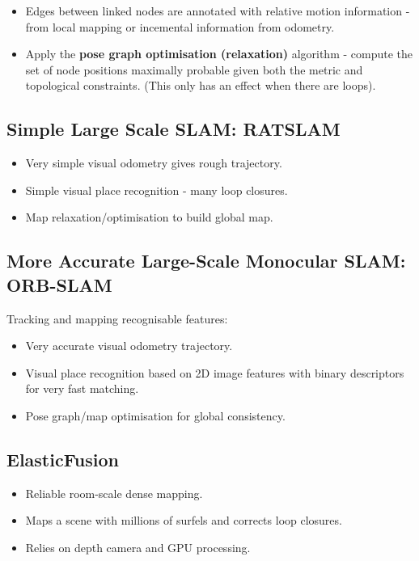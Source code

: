 \documentclass[11pt]{article}
\begin{document}
\begin{itemize}
  \item Edges between linked nodes are annotated with relative motion information - from local mapping or incemental information from odometry.
  \item Apply the \textbf{pose graph optimisation (relaxation)} algorithm - compute the set of node positions maximally probable given both the metric and topological constraints.
    (This only has an effect when there are loops).
\end{itemize}

\subsection{Simple Large Scale SLAM: RATSLAM}
\begin{itemize}
  \item Very simple visual odometry gives rough trajectory.
  \item Simple visual place recognition - many loop closures.
  \item Map relaxation/optimisation to build global map.
\end{itemize}

\subsection{More Accurate Large-Scale Monocular SLAM: ORB-SLAM}
Tracking and mapping recognisable features:
\begin{itemize}
  \item Very accurate visual odometry trajectory.
  \item Visual place recognition based on 2D image features with binary descriptors for very fast matching.
  \item Pose graph/map optimisation for global consistency.
\end{itemize}

\subsection{ElasticFusion}
\begin{itemize}
  \item Reliable room-scale dense mapping.
  \item Maps a scene with millions of surfels and corrects loop closures.
  \item Relies on depth camera and GPU processing.
\end{itemize}
\end{document}
